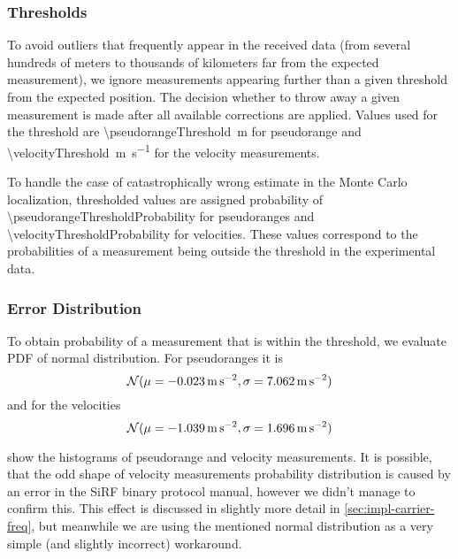 \subsubsection{Thresholds}
\label{sec:gps-thresholds}
To avoid outliers that frequently appear in the received data (from several hundreds
of meters to thousands of kilometers far from the expected measurement), we
ignore measurements appearing further than a given threshold from the expected position.
The decision whether to throw away a given measurement is made after all available corrections
are applied.
Values used for the threshold are \SI{\pseudorangeThreshold}{\meter} for pseudorange
and \SI{\velocityThreshold}{\meter\per\second} for the velocity measurements.

To handle the case of catastrophically wrong estimate in the Monte Carlo localization,
thresholded values are assigned probability of \num{\pseudorangeThresholdProbability} for
pseudoranges and \num{\velocityThresholdProbability} for velocities.
These values correspond to the probabilities of a measurement being outside the
threshold in the experimental data.

\subsubsection{Error Distribution}
To obtain probability of a measurement that is within the threshold, we evaluate
PDF of normal distribution.
For pseudoranges it is
\begin{equation}
\operatorname{\mathcal{N}}(\mu = \SI{-0.023}{\meter\per\second\squared}, \sigma = \SI{7.062}{\meter\per\second\squared})
\end{equation}
and for the velocities
\begin{equation}
\operatorname{\mathcal{N}}(\mu = \SI{-1.039}{\meter\per\second\squared}, \sigma = \SI{1.696}{\meter\per\second\squared})
\end{equation}

 show the histograms of pseudorange
and velocity measurements.
It is possible, that the odd shape of velocity measurements probability distribution
is caused by an error in the SiRF binary protocol manual, however we didn't manage
to confirm this.
This effect is discussed in slightly more detail in \cref{sec:impl-carrier-freq},
but meanwhile we are using the mentioned normal distribution as a very simple
(and slightly incorrect) workaround.

